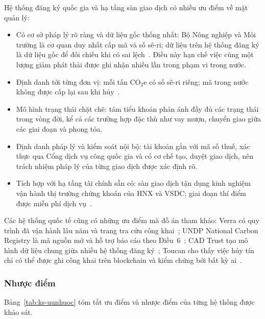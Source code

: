 Hệ thống đăng ký quốc gia và hạ tầng sàn giao dịch có nhiều ưu điểm về mặt quản lý:
\begin{itemize}
    \item Có cơ sở pháp lý rõ ràng và dữ liệu gốc thống nhất: Bộ Nông nghiệp và Môi trường là cơ quan duy nhất cấp mã và số sê-ri; dữ liệu trên hệ thống đăng ký là dữ liệu gốc để đối chiếu khi có sai lệch~\cite{vietnam2026thongtu11}. Điều này hạn chế việc cùng một lượng giảm phát thải được ghi nhận nhiều lần trong phạm vi trong nước.
    \item Định danh tới từng đơn vị: mỗi tấn CO$_2$e có số sê-ri riêng; mã trong nước không được cấp lại sau khi hủy~\cite{vietnam2026thongtu11}.
    \item Mô hình trạng thái chặt chẽ: tám tiểu khoản phản ánh đầy đủ các trạng thái trong vòng đời, kể cả các trường hợp đặc thù như vay mượn, chuyển giao giữa các giai đoạn và phong tỏa.
    \item Định danh pháp lý và kiểm soát nội bộ: tài khoản gắn với mã số thuế, xác thực qua Cổng dịch vụ công quốc gia và có cơ chế tạo, duyệt giao dịch, nên trách nhiệm pháp lý của từng giao dịch được xác định rõ.
    \item Tích hợp với hạ tầng tài chính sẵn có: sàn giao dịch tận dụng kinh nghiệm vận hành thị trường chứng khoán của HNX và VSDC; giai đoạn thí điểm được miễn phí dịch vụ~\cite{vietnam2026nghidinh29}.
\end{itemize}
Các hệ thống quốc tế cũng có những ưu điểm mà đồ án tham khảo: Verra có quy trình đã vận hành lâu năm và trang tra cứu công khai~\cite{verra2024vcs}; UNDP National Carbon Registry là mã nguồn mở và hỗ trợ báo cáo theo Điều~6~\cite{undp2024nationalregistry}; CAD Trust tạo mô hình dữ liệu chung giữa nhiều hệ thống đăng ký~\cite{cadtrust2025datamodel}; Toucan cho thấy việc hủy tín chỉ có thể được ghi công khai trên blockchain và kiểm chứng bởi bất kỳ ai~\cite{toucan2025docs}.

\subsubsection*{Nhược điểm}

Bảng~\ref{tab:ks-uunhuoc} tóm tắt ưu điểm và nhược điểm của từng hệ thống được khảo sát.

